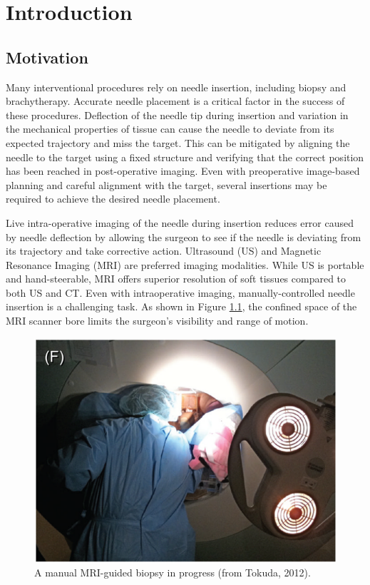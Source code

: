 \chapter{Introduction}
\label{sec:intro} %
\section{Motivation}
Many interventional procedures rely on needle insertion, including biopsy and brachytherapy\cite{bomers_mri-guided_2012}. Accurate needle placement is a critical factor in the success of these procedures\cite{nath_dosimetric_2000, youk_missed_2007}. Deflection of the needle tip during insertion and variation in the mechanical properties of tissue can cause the needle to deviate from its expected trajectory and miss the target. This can be mitigated by aligning the needle to the target using a fixed structure and verifying that the correct position has been reached in post-operative imaging\cite{tokuda_-bore_2012}. Even with preoperative image-based planning and careful alignment with the target, several insertions may be required to achieve the desired needle placement\cite{onik_ct-guided_1988}. 

Live intra-operative imaging of the needle during insertion reduces error caused by needle deflection by allowing the surgeon to see if the needle is deviating from its trajectory and take corrective action. Ultrasound (US) and Magnetic Resonance Imaging (MRI) are preferred imaging modalities. While US is portable and hand-steerable, MRI offers superior resolution of soft tissues compared to both US and CT\cite{weiss_mr-guided_2008}. Even with intraoperative imaging, manually-controlled needle insertion is  a challenging task. As shown in Figure \ref{fig:mri_intraoperative}, the confined space of the MRI scanner bore  limits the surgeon's visibility and range of motion\cite{menard_mri_}.

\begin{figure}[h]
\includegraphics[width=1.0\textwidth]{Fig/chap1/tokuda_action_shot.png}
\caption{A manual MRI-guided biopsy in progress (from Tokuda, 2012).}
\label{fig:mri_intraoperative}
\end{figure}

